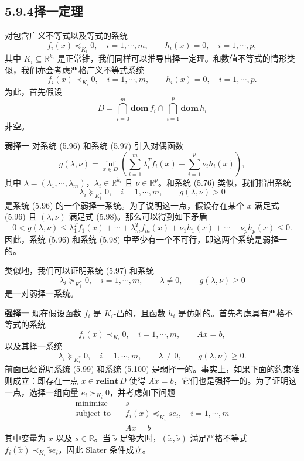 \documentclass[UTF8,12pt,a4paper,fontset=fandol]{ctexart}
\begin{document}
\subsection*{5.9.4\quad 择一定理}

对包含广义不等式以及等式的系统
\begin{equation}
f_i(x)\preceq_{K_i}0,\quad i=1,\cdots,m,\qquad h_i(x)=0,\quad i=1,\cdots,p,
\tag{5.96}
\end{equation}
其中 $K_i\subseteq\mathbb{R}^{k_i}$ 是正常锥，我们同样可以推导出择一定理。和数值不等式的情形类似，我们亦会考虑严格广义不等式系统
\begin{equation}
f_i(x)\prec_{K_i}0,\quad i=1,\cdots,m,\qquad h_i(x)=0,\quad i=1,\cdots,p.
\tag{5.97}
\end{equation}
为此，首先假设
\[
D=\bigcap_{i=0}^m \mathbf{dom}\,f_i\cap\bigcap_{i=1}^p \mathbf{dom}\,h_i
\]
非空。

\noindent\textbf{弱择一}\quad
对系统 (5.96) 和系统 (5.97) 引入对偶函数
\[
g(\lambda,\nu)=\inf_{x\in D}\left(\sum_{i=1}^m\lambda_i^Tf_i(x)+\sum_{i=1}^p\nu_i h_i(x)\right),
\]
其中 $\lambda=(\lambda_1,\cdots,\lambda_m)$，$\lambda_i\in\mathbb{R}^{k_i}$ 且 $\nu\in\mathbb{R}^p$。和系统 (5.76) 类似，我们指出系统
\begin{equation}
\lambda_i\succeq_{K_i^\ast}0,\quad i=1,\cdots,m,\qquad g(\lambda,\nu)>0
\tag{5.98}
\end{equation}
是系统 (5.96) 的一个弱择一系统。为了说明这一点，假设存在某个 $x$ 满足式 (5.96) 且 $(\lambda,\nu)$ 满足式 (5.98)。那么可以得到如下矛盾
\[
0<g(\lambda,\nu)\leq \lambda_1^Tf_1(x)+\cdots+\lambda_m^Tf_m(x)+\nu_1h_1(x)+\cdots+\nu_ph_p(x)\leq 0.
\]
因此，系统 (5.96) 和系统 (5.98) 中至少有一个不可行，即这两个系统是弱择一的。

类似地，我们可以证明系统 (5.97) 和系统
\[
\lambda_i\succeq_{K_i^\ast}0,\quad i=1,\cdots,m,\qquad \lambda\neq 0,\qquad g(\lambda,\nu)\geq 0
\]
是一对弱择一系统。

\noindent\textbf{强择一}\quad
现在假设函数 $f_i$ 是 $K_i$-凸的，且函数 $h_i$ 是仿射的。首先考虑具有严格不等式的系统
\begin{equation}
f_i(x)\prec_{K_i}0,\quad i=1,\cdots,m,\qquad Ax=b,
\tag{5.99}
\end{equation}
以及其择一系统
\begin{equation}
\lambda_i\succeq_{K_i^\ast}0,\quad i=1,\cdots,m,\qquad \lambda\neq 0,\qquad g(\lambda,\nu)\geq 0.
\tag{5.100}
\end{equation}
前面已经说明系统 (5.99) 和系统 (5.100) 是弱择一的。事实上，如果下面的约束准则成立：即存在一点 $\tilde{x}\in\mathbf{relint}\,D$ 使得 $A\tilde{x}=b$，它们也是强择一的。为了证明这一点，选择一组向量 $e_i\succ_{K_i}0$，并考虑如下问题
\begin{equation}
\begin{aligned}
\text{minimize}\quad & s\\
\text{subject to}\quad & f_i(x)\preceq_{K_i}se_i,\quad i=1,\cdots,m\\
& Ax=b
\end{aligned}
\tag{5.101}
\end{equation}
其中变量为 $x$ 以及 $s\in\mathbb{R}$。当 $\tilde{s}$ 足够大时，$(\tilde{x},\tilde{s})$ 满足严格不等式 $f_i(\tilde{x})\prec_{K_i}\tilde{s}e_i$，因此 Slater 条件成立。
\end{document}

